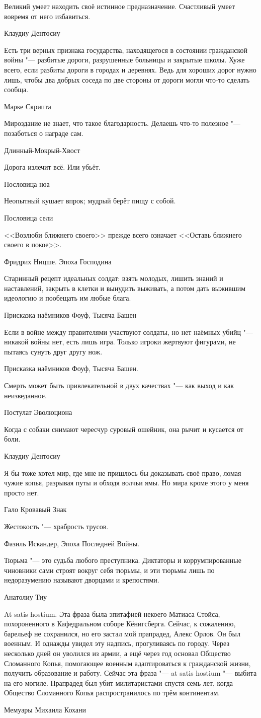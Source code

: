 \epigraph
{Великий умеет находить своё истинное предназначение.
Счастливый умеет вовремя от него избавиться.}
{Клаудиу Дентосиу}

\epigraph
{Есть три верных признака государства, находящегося в состоянии гражданской войны "--- разбитые дороги, разрушенные больницы и закрытые школы.
Хуже всего, если разбиты дороги в городах и деревнях.
Ведь для хороших дорог нужно лишь, чтобы два добрых соседа по две стороны от дороги могли что-то сделать сообща.}
{Марке Скрипта}

\epigraph
{Мироздание не знает, что такое благодарность.
Делаешь что-то полезное "--- позаботься о награде сам.}
{Длинный-Мокрый-Хвост}

\epigraph
{Дорога излечит всё.
Или убьёт.}
{Пословица ноа}

\epigraph
{Неопытный кушает впрок;
мудрый берёт пищу с собой.}
{Пословица сели}

\epigraph
{<<Возлюби ближнего своего>> прежде всего означает <<Оставь ближнего своего в покое>>.}
{Фридрих Ницше.
Эпоха Господина}

\epigraph
{Старинный рецепт идеальных солдат: взять молодых, лишить знаний и наставлений, закрыть в клетки и вынудить выживать, а потом дать выжившим идеологию и пообещать им любые блага.}
{Присказка наёмников Фоуф, Тысяча Башен}

\epigraph
{Если в войне между правителями участвуют солдаты, но нет наёмных убийц "--- никакой войны нет, есть лишь игра.
Только игроки жертвуют фигурами, не пытаясь сунуть друг другу нож.}
{Присказка наёмников Фоуф, Тысяча Башен.}

\epigraph
{Смерть может быть привлекательной в двух качествах "--- как выход и как неизведанное.}
{Постулат Эволюциона}

\epigraph
{Когда с собаки снимают чересчур суровый ошейник, она рычит и кусается от боли.}
{Клаудиу Дентосиу}

\epigraph
{Я бы тоже хотел мир, где мне не пришлось бы доказывать своё право, ломая чужие копья, разрывая путы и обходя волчьи ямы.
Но мира кроме этого у меня просто нет.}
{Гало Кровавый Знак}

\epigraph
{Жестокость "--- храбрость трусов.}
{Фазиль Искандер, Эпоха Последней Войны.}

\epigraph
{Тюрьма "--- это судьба любого преступника.
Диктаторы и коррумпированные чиновники сами строят вокруг себя тюрьмы, и эти тюрьмы лишь по недоразумению называют дворцами и крепостями.}
{Анатолиу Тиу}

\epigraph
{At satis hostium.
Эта фраза была эпитафией некоего Матиаса Стойса, похороненного в Кафедральном соборе Кёнигсберга.
Сейчас, к сожалению, барельеф не сохранился, но его застал мой прапрадед, Алекс Орлов.
Он был военным.
И однажды увидел эту надпись, прогуливаясь по городу.
Через несколько дней он уволился из армии, а ещё через год основал Общество Сломанного Копья, помогающее военным адаптироваться к гражданской жизни, получить образование и работу.
Сейчас эта фраза "--- at satis hostium "--- выбита на его могиле.
Прапрадед был убит милитаристами спустя семь лет, когда Общество Сломанного Копья распространилось по трём континентам.}
{Мемуары Михаила Кохани}

